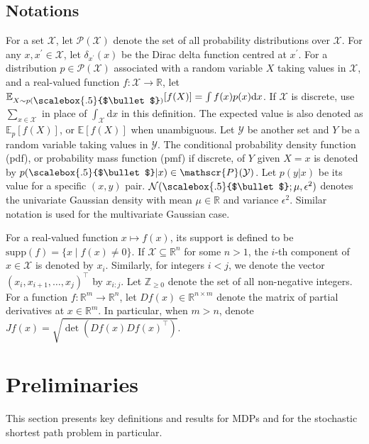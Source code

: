 \documentclass{amsart}
\renewcommand{\cdot}[1][.5]{%
  \mathbin{\vcenter{\hbox{\scalebox{#1}{$\bullet$}}}}%
}
\begin{document}
\subsection{Notations}

For a set $\mathcal{X}$, let $\mathscr{P}(\mathcal{X})$ denote the set of all probability distributions over $\mathcal{X}$. For any $x,x^\prime \in \mathcal{X}$, let $\delta_{x^\prime}(x)$ be the Dirac delta function centred at $x^\prime$. For a distribution $p \in \mathscr{P}(\mathcal{X})$ associated with a random variable $X$ taking values in $\mathcal{X}$,  and a real-valued function $f:\mathcal{X} \rightarrow \mathbb{R}$, let $\mathbb{E}_{X \sim p(\cdot)}[f(X)] = \int f(x) p(x) \mathrm{d}x$. If  $\mathcal{X}$ is discrete, use $\sum_{x \in \mathcal{X}}$ in place of $\int_{\mathcal{X}} \mathrm{d} x$ in this definition. The expected value is also denoted as $\mathbb{E}_p[f(X)]$, or $\mathbb{E}[f(X)]$ when unambiguous. Let $\mathcal{Y}$ be another set and $Y$ be a random variable taking values in $\mathcal{Y}$. The conditional probability density function (pdf), or probability mass function (pmf) if discrete, of $Y$ given $X=x$ is denoted by $p(\cdot|x) \in \mathscr{P}({\mathcal{Y}})$. Let $p(y|x)$ be its value for a specific $(x,y)$ pair. $\mathcal{N}(\cdot;\mu,\epsilon^2)$ denotes the univariate Gaussian density with mean $\mu \in \mathbb{R}$ and variance $\epsilon^2$. Similar notation is used for the multivariate Gaussian case.



For a real-valued function $x \mapsto f(x)$, its support is defined to be $\mathrm{supp}(f)=\{x \mid f(x)\neq 0\}$. If $\mathcal{X} \subseteq \mathbb{R}^n$ for some  $n>1$, the $i$-th component of $x \in \mathcal{X}$ is denoted by $x_i$. Similarly, for integers $i<j$, we denote the vector $(x_i,x_{i+1},\dots,x_j)^{\top}$ by $x_{i:j}$. Let $\mathbb{Z}_{\geq 0}$ denote the set of all non-negative integers. For a function $f:\mathbb{R}^m \rightarrow \mathbb{R}^n$, let $Df(x) \in \mathbb{R}^{n\times m}$ denote the matrix of partial derivatives at $x \in \mathbb{R}^m$. In particular, when $m > n$, denote $Jf(x)=\sqrt{\det{(Df(x)Df(x)^\top)}}$.






\section{Preliminaries}
\label{sec:prelim}
This section presents key definitions and results for MDPs and for the stochastic shortest path problem in particular.
\end{document}
